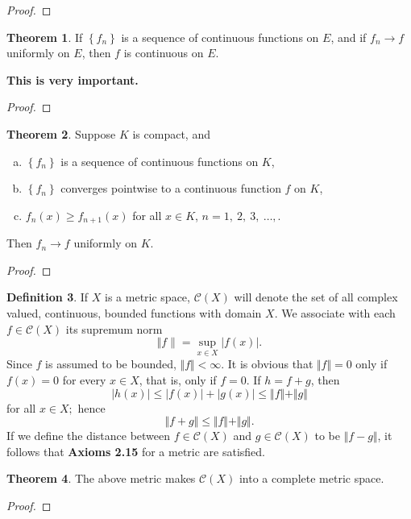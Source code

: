\documentclass[12pt]{book}
\theoremstyle{definition}
\newtheorem{theorem}{Theorem}[chapter]
\newtheorem{definition}[theorem]{Definition}
\begin{document}
	\begin{proof}
	\end{proof}
	\newpage
	\begin{theorem}
		If $\left\{f_n\right\}$ is a sequence of continuous functions on $E$, and if $f_n\rightarrow f$ uniformly on $E$, then $f$ is continuous on $E$.
	\end{theorem}
	\textbf{This is very important.}
	\begin{proof}
	\end{proof}
	\newpage
	\begin{theorem}
		Suppose $K$ is compact, and
		\begin{enumerate}[(a)]
			\item $\left\{f_n\right\}$ is a sequence of continuous functions on $K$, 
			\item $\left\{f_n\right\}$ converges pointwise to a continuous function $f$ on $K$,
			\item $f_n(x)\geq f_{n+1}(x)$ for all $x\in K$, $n=1,~2,~3,~\ldots,$.
		\end{enumerate}
		Then $f_n\rightarrow f$ uniformly on $K$.
	\end{theorem}
	\begin{proof}
	\end{proof}
	\newpage
	\begin{definition}
		If $X$ is a metric space, $\mathscr{C}(X)$ will denote the set of all complex valued, continuous, bounded functions with domain $X$.
		We associate with each $f\in\mathscr{C}(X)$ its supremum norm $$\Vert f\rVert =\sup_{x\in X} |f(x)|.$$
		Since $f$ is assumed to be bounded, $\Vert f \Vert<\infty$. It is obvious that $\Vert f\Vert=0$ only if $f(x)=0$ for every $x\in X$, that is, only if $f=0$. If $h=f+g$, then $$|h(x)|\leq |f(x)|+|g(x)|\leq \Vert f\Vert +\Vert g \Vert$$ for all $x\in X;$ hence $$\Vert f+g\Vert \leq \Vert f\Vert + \Vert g \Vert.$$
		If we define the distance between $f\in\mathscr{C}(X)$ and $g\in\mathscr{C}(X)$ to be $\Vert f-g\Vert$, it follows that \textbf{Axioms 2.15} for a metric are satisfied.
	\end{definition}
	\newpage
	\begin{theorem}
		The above metric makes $\mathscr{C}(X)$ into a complete metric space.
	\end{theorem}
	\begin{proof}
	\end{proof}
	\newpage
\end{document}

